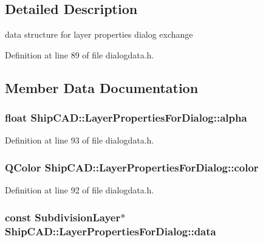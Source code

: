 \subsection{Detailed Description}
data structure for layer properties dialog exchange 

Definition at line 89 of file dialogdata.\+h.



\subsection{Member Data Documentation}
\subsubsection[{\texorpdfstring{alpha}{alpha}}]{\setlength{\rightskip}{0pt plus 5cm}float Ship\+C\+A\+D\+::\+Layer\+Properties\+For\+Dialog\+::alpha}\hypertarget{structShipCAD_1_1LayerPropertiesForDialog_a8ecd6d4c933122d9f3c8f3c8fcf54781}{}\label{structShipCAD_1_1LayerPropertiesForDialog_a8ecd6d4c933122d9f3c8f3c8fcf54781}


Definition at line 93 of file dialogdata.\+h.

\subsubsection[{\texorpdfstring{color}{color}}]{\setlength{\rightskip}{0pt plus 5cm}Q\+Color Ship\+C\+A\+D\+::\+Layer\+Properties\+For\+Dialog\+::color}\hypertarget{structShipCAD_1_1LayerPropertiesForDialog_a20a555fd2c477f691cc04a4fe9b7f6b0}{}\label{structShipCAD_1_1LayerPropertiesForDialog_a20a555fd2c477f691cc04a4fe9b7f6b0}


Definition at line 92 of file dialogdata.\+h.

\subsubsection[{\texorpdfstring{data}{data}}]{\setlength{\rightskip}{0pt plus 5cm}const {\bf Subdivision\+Layer}$\ast$ Ship\+C\+A\+D\+::\+Layer\+Properties\+For\+Dialog\+::data}\hypertarget{structShipCAD_1_1LayerPropertiesForDialog_a0bcd4eb69a1b82c26e9dfcf1707cf850}{}\label{structShipCAD_1_1LayerPropertiesForDialog_a0bcd4eb69a1b82c26e9dfcf1707cf850}


